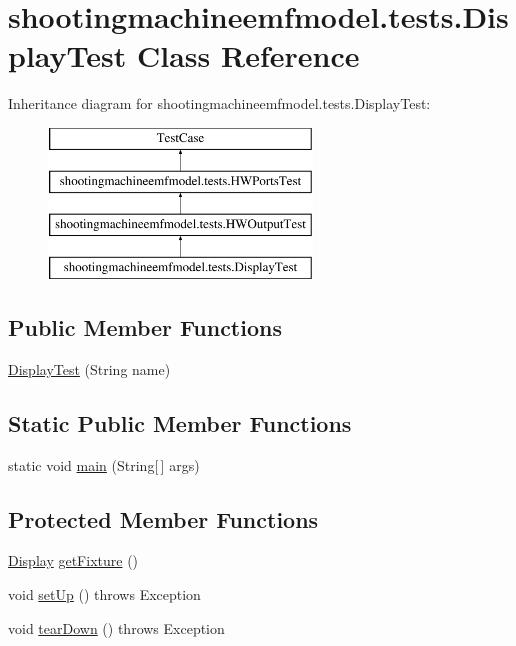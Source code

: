 \hypertarget{classshootingmachineemfmodel_1_1tests_1_1_display_test}{\section{shootingmachineemfmodel.\-tests.\-Display\-Test Class Reference}
\label{classshootingmachineemfmodel_1_1tests_1_1_display_test}
}
Inheritance diagram for shootingmachineemfmodel.\-tests.\-Display\-Test\-:\begin{figure}[H]
\begin{center}
\leavevmode
\includegraphics[height=4.000000cm]{classshootingmachineemfmodel_1_1tests_1_1_display_test}
\end{center}
\end{figure}
\subsection*{Public Member Functions}
\begin{DoxyCompactItemize}
\item 
\hyperlink{classshootingmachineemfmodel_1_1tests_1_1_display_test_af5843e10fcbeb70d71373486444d56fa}{Display\-Test} (String name)
\end{DoxyCompactItemize}
\subsection*{Static Public Member Functions}
\begin{DoxyCompactItemize}
\item 
static void \hyperlink{classshootingmachineemfmodel_1_1tests_1_1_display_test_a2355401f82128b74a63a5c4dd6961d9d}{main} (String\mbox{[}$\,$\mbox{]} args)
\end{DoxyCompactItemize}
\subsection*{Protected Member Functions}
\begin{DoxyCompactItemize}
\item 
\hyperlink{interfaceshootingmachineemfmodel_1_1_display}{Display} \hyperlink{classshootingmachineemfmodel_1_1tests_1_1_display_test_a973f05d61f9fd759cc305dd7670dc44a}{get\-Fixture} ()
\item 
void \hyperlink{classshootingmachineemfmodel_1_1tests_1_1_display_test_a0e4fd3e395c04c8cadc0553e5325512c}{set\-Up} ()  throws Exception 
\item 
void \hyperlink{classshootingmachineemfmodel_1_1tests_1_1_display_test_aa296294b30bef80b026a1f96cebfad04}{tear\-Down} ()  throws Exception 
\end{DoxyCompactItemize}
